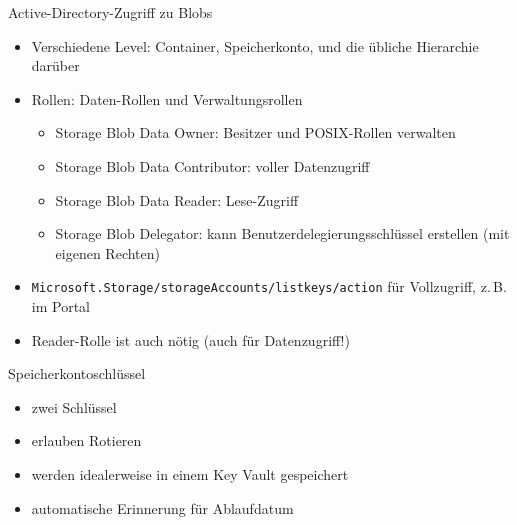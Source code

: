 \begin{flashcard}[Definition]{Active-Directory-Zugriff zu Blobs}
  \begin{itemize}
    \item Verschiedene Level: Container, Speicherkonto,\newline
      und die übliche Hierarchie darüber
    \item Rollen: Daten-Rollen und Verwaltungsrollen
      \begin{itemize}
        \item Storage Blob Data Owner: Besitzer und POSIX-Rollen verwalten
        \item Storage Blob Data Contributor: voller Datenzugriff
        \item Storage Blob Data Reader: Lese-Zugriff
        \item Storage Blob Delegator: kann Benutzerdelegierungsschlüssel erstellen\newline
        (mit eigenen Rechten)
      \end{itemize}
    \item \texttt{Microsoft.Storage/storageAccounts/listkeys/action} für Vollzugriff, z.\,B. im Portal
    \item Reader-Rolle ist auch nötig (auch für Datenzugriff!)
  \end{itemize}
\end{flashcard}

\begin{flashcard}[Definition]{Speicherkontoschlüssel}
  \begin{itemize}
    \item zwei Schlüssel
    \item erlauben Rotieren
    \item werden idealerweise in einem Key Vault gespeichert
    \item automatische Erinnerung für Ablaufdatum
  \end{itemize}
\end{flashcard}

